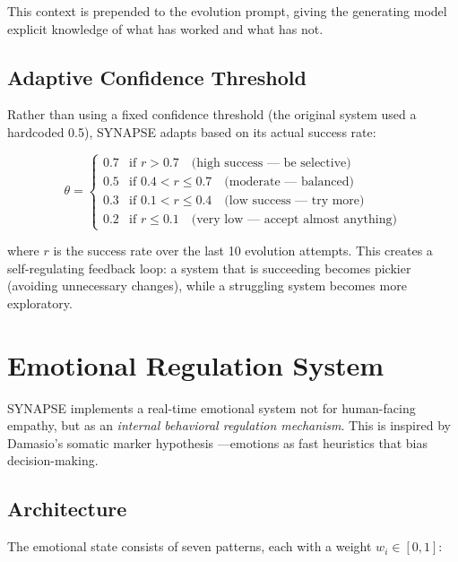 \documentclass[11pt,a4paper]{article}
\begin{document}
This context is prepended to the evolution prompt, giving the generating model explicit knowledge of what has worked and what has not.

\subsection{Adaptive Confidence Threshold}

Rather than using a fixed confidence threshold (the original system used a hardcoded 0.5), SYNAPSE adapts based on its actual success rate:

\begin{equation}
\theta = \begin{cases}
0.7 & \text{if } r > 0.7 \quad \text{(high success --- be selective)} \\
0.5 & \text{if } 0.4 < r \leq 0.7 \quad \text{(moderate --- balanced)} \\
0.3 & \text{if } 0.1 < r \leq 0.4 \quad \text{(low success --- try more)} \\
0.2 & \text{if } r \leq 0.1 \quad \text{(very low --- accept almost anything)}
\end{cases}
\label{eq:threshold}
\end{equation}

where $r$ is the success rate over the last 10 evolution attempts. This creates a self-regulating feedback loop: a system that is succeeding becomes pickier (avoiding unnecessary changes), while a struggling system becomes more exploratory.

\section{Emotional Regulation System}
\label{sec:emotions}

SYNAPSE implements a real-time emotional system not for human-facing empathy, but as an \textit{internal behavioral regulation mechanism}. This is inspired by Damasio's somatic marker hypothesis \cite{damasio1994descartes}---emotions as fast heuristics that bias decision-making.

\subsection{Architecture}

The emotional state consists of seven patterns, each with a weight $w_i \in [0, 1]$:
\end{document}
